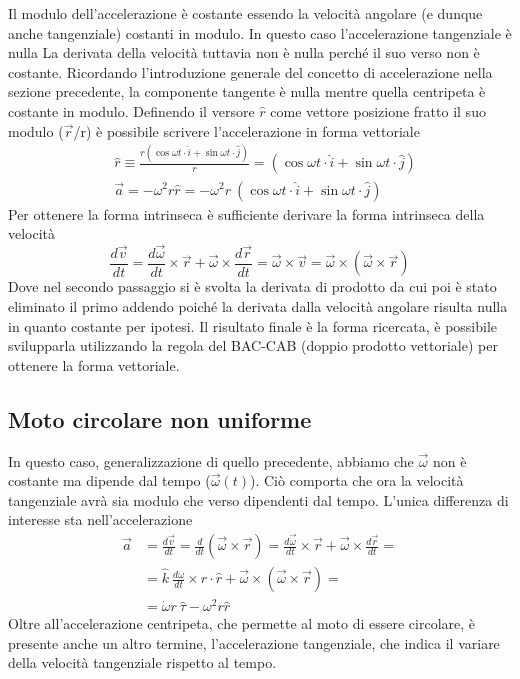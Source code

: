 \documentclass[10pt,a4paper]{article}
\begin{document}
Il modulo dell'accelerazione è costante essendo la velocità angolare (e dunque anche tangenziale) costanti in modulo. In questo caso l'accelerazione tangenziale è nulla La derivata della velocità tuttavia non è nulla perché il suo verso non è costante. Ricordando l'introduzione generale del concetto di accelerazione nella sezione precedente, la componente tangente è nulla mentre quella centripeta è costante in modulo. Definendo il versore $\hat{r}$ come vettore posizione fratto il suo modulo ($\vec{r}$/r) è possibile scrivere l'accelerazione in forma vettoriale
\begin{align*}
	&\hat{r} \equiv \frac{r(\cos\omega t \cdot \hat{i} + \sin \omega t \cdot \hat{j})}{r} = (\cos\omega t \cdot \hat{i} + \sin \omega t \cdot \hat{j})\\
	&\vec{a} = -\omega^2 r \hat{r} = -\omega^2 r\ (\cos\omega t \cdot \hat{i} + \sin \omega t \cdot \hat{j})
\end{align*}
Per ottenere la forma intrinseca è sufficiente derivare la forma intrinseca della velocità
\begin{equation*}
	\frac{d\vec{v}}{dt} = \frac{d\vec{\omega}}{dt} \times \vec{r} + \vec{\omega} \times \frac{d\vec{r}}{dt} = \vec{\omega} \times \vec{v} = \vec{\omega} \times (\vec{\omega} \times \vec{r})
\end{equation*}
Dove nel secondo passaggio si è svolta la derivata di prodotto da cui poi è stato eliminato il primo addendo poiché la derivata dalla velocità angolare risulta nulla in quanto costante per ipotesi. Il risultato finale è la forma ricercata, è possibile svilupparla utilizzando la regola del BAC-CAB (doppio prodotto vettoriale) per ottenere la forma vettoriale. 
\subsection{Moto circolare non uniforme}
In questo caso, generalizzazione di quello precedente, abbiamo che $\vec{\omega}$ non è costante ma dipende dal tempo ($\vec{\omega}(t)$). Ciò comporta che ora la velocità tangenziale avrà sia modulo che verso dipendenti dal tempo. L'unica differenza di interesse sta nell'accelerazione
\begin{align*}
	\vec{a} &=\frac{d\vec{v}}{dt}= \frac{d}{dt} (\vec{\omega} \times \vec{r}) = \frac{d\vec{\omega}}{dt} \times \vec{r} + \vec{\omega} \times \frac{d\vec{r}}{dt} =\\
	 &=\hat{k}\ \frac{d\omega}{dt} \times r \cdot \hat{r} + \vec{\omega} \times (\vec{\omega} \times \vec{r}) =\\ &=\dot{\omega} r\ \hat{\tau} - \omega^2 r \hat{r}
\end{align*}
Oltre all'accelerazione centripeta, che permette al moto di essere circolare, è presente anche un altro termine, l'accelerazione tangenziale, che indica il variare della velocità tangenziale rispetto al tempo.
\end{document}

